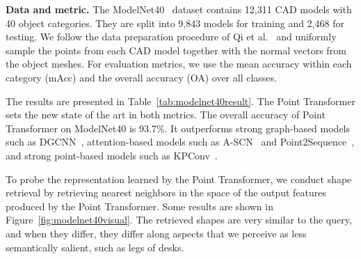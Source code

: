 \noindent\textbf{Data and metric.}
The ModelNet40~\cite{wu2015modelnet} dataset contains 12,311 CAD models with 40 object categories. They are split into 9,843 models for training and 2,468 for testing. We follow the data preparation procedure of Qi et al.~\cite{qi2017pointnet2} and uniformly sample the points from each CAD model together with the normal vectors from the object meshes. For evaluation metrics, we use the mean accuracy within each category (mAcc) and the overall accuracy (OA) over all classes.

The results are presented in Table~\ref{tab:modelnet40result}. The Point Transformer sets the new state of the art in both metrics. The overall accuracy of Point Transformer on ModelNet40 is 93.7\%. It outperforms strong graph-based models such as DGCNN~\cite{wang2019dgcnn}, attention-based models such as A-SCN~\cite{xie2018attentional} and Point2Sequence~\cite{liu2019point2sequence},
and strong point-based models such as KPConv~\cite{thomas2019kpconv}.

To probe the representation learned by the Point Transformer, we conduct shape retrieval by retrieving nearest neighbors in the space of the output features produced by the Point Transformer. Some results are shown in Figure~\ref{fig:modelnet40visual}. The retrieved shapes are very similar to the query, and when they differ, they differ along aspects that we perceive as less semantically salient, such as legs of desks.

